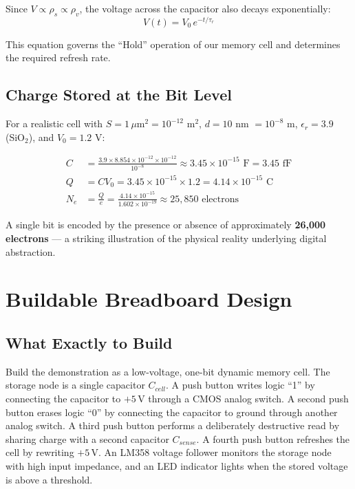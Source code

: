 \documentclass[12pt,a4paper]{report}
\begin{document}
Since $V \propto \rho_s \propto \rho_v$, the voltage across the capacitor also decays exponentially:
\begin{equation}
    V(t) = V_0 \, e^{-t/\tau_r}
    \label{eq:V_decay}
\end{equation}

This equation governs the ``Hold'' operation of our memory cell and determines the required refresh rate.

\section{Charge Stored at the Bit Level}

For a realistic cell with $S = 1\,\mu\text{m}^2 = 10^{-12}$ m$^2$, $d = 10$ nm $= 10^{-8}$ m, $\epsilon_r = 3.9$ (SiO$_2$), and $V_0 = 1.2$ V:

\begin{align}
    C &= \frac{3.9 \times 8.854 \times 10^{-12} \times 10^{-12}}{10^{-8}} \approx 3.45 \times 10^{-15} \text{ F} = 3.45 \text{ fF} \\
    Q &= C V_0 = 3.45 \times 10^{-15} \times 1.2 = 4.14 \times 10^{-15} \text{ C} \\
    N_e &= \frac{Q}{e} = \frac{4.14 \times 10^{-15}}{1.602 \times 10^{-19}} \approx 25,850 \text{ electrons}
\end{align}

A single bit is encoded by the presence or absence of approximately \textbf{26,000 electrons} --- a striking illustration of the physical reality underlying digital abstraction.



\chapter{Buildable Breadboard Design}
\label{ch:build}

\section{What Exactly to Build}

Build the demonstration as a low-voltage, one-bit dynamic memory cell. The storage node is a single capacitor $C_{cell}$. A push button writes logic ``1'' by connecting the capacitor to $+5\,\mathrm{V}$ through a CMOS analog switch. A second push button erases logic ``0'' by connecting the capacitor to ground through another analog switch. A third push button performs a deliberately destructive read by sharing charge with a second capacitor $C_{sense}$. A fourth push button refreshes the cell by rewriting $+5\,\mathrm{V}$. An LM358 voltage follower monitors the storage node with high input impedance, and an LED indicator lights when the stored voltage is above a threshold.
\end{document}
